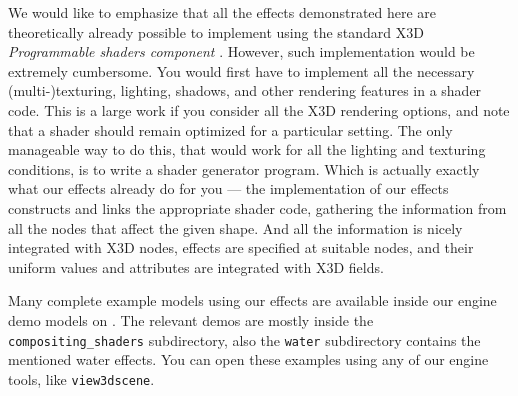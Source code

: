 \documentclass{egpubl}
\begin{document}
We would like to emphasize that all the effects demonstrated here
are theoretically already possible to implement using the standard
X3D \textit{Programmable shaders component} \cite{x3d:shaders}. However, such implementation
would be extremely cumbersome.
You would first have to implement all the necessary (multi-)texturing, lighting,
shadows, and other rendering features in a shader code.
This is a large work if you consider all the X3D rendering options, and note that
a shader should remain optimized for a particular setting.
The only manageable way to do this, that would work for all the lighting
and texturing conditions, is to write a shader generator program.
Which is actually exactly what our effects already do for you ---
the implementation of our effects constructs and links
the appropriate shader code, gathering the information from all the nodes
that affect the given shape. And all the information is nicely integrated
with X3D nodes, effects are specified at suitable nodes, and their
uniform values and attributes are integrated with X3D fields.

Many complete example models using our effects
are available inside our engine demo models on
.
The relevant demos are mostly inside the \texttt{compositing\_shaders}
subdirectory, also the \texttt{water} subdirectory contains
the mentioned water effects.
You can open these examples using any of our engine tools,
like \texttt{view3dscene}.


\end{document}
